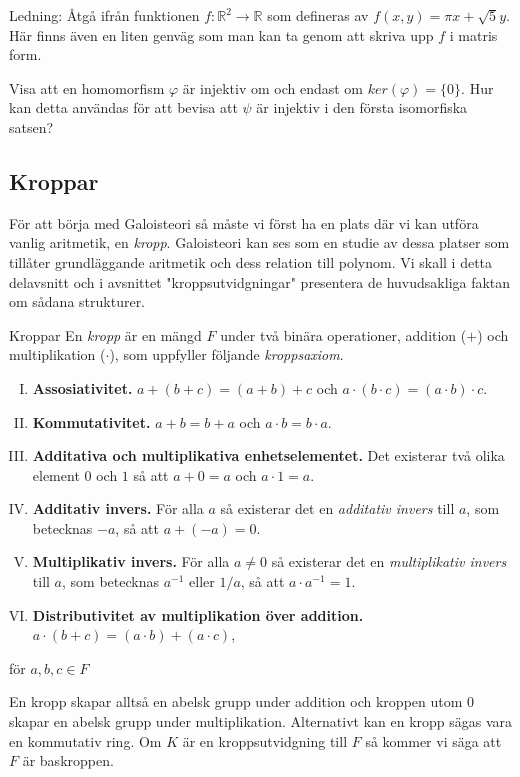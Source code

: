 \documentclass{article}
\theoremstyle{definition}
\begin{document}
Ledning: Åtgå ifrån funktionen $f: \mathbb{R}^2 \rightarrow \mathbb{R}$ som defineras av $f(x, y) = \pi x + \sqrt 5 y$. 
Här finns även en liten genväg som man kan ta genom att skriva upp $f$ i matris form. 


\begin{ovning}{2}
  Visa att en homomorfism $\varphi$ är injektiv om och endast om $ker(\varphi) = \{0\}.$ Hur kan detta användas för att bevisa att 
  $\psi$ är injektiv i den första isomorfiska satsen?
\end{ovning}

\subsection{Kroppar}
För att börja med Galoisteori så måste vi först ha en plats där vi kan utföra vanlig aritmetik, en \textit{kropp}. Galoisteori kan ses som en studie 
av dessa platser som tillåter grundläggande aritmetik och dess relation till polynom. Vi skall i detta delavsnitt och i avsnittet "kroppsutvidgningar" 
presentera de huvudsakliga faktan om 
sådana strukturer. 


\begin{mydef}{Kroppar}{}
    En \textit{kropp} är en mängd $F$ under två binära operationer, addition ($+$) och multiplikation ($\cdot$), som uppfyller följande \textit{kroppsaxiom}.
    \begin{enumerate}[I)]
        \item \textbf{Assosiativitet.} $a + (b + c) = (a + b) + c$ och $a \cdot (b \cdot c) = (a \cdot b) \cdot c$.
        \item \textbf{Kommutativitet.} $a + b = b + a$ och $a \cdot b = b \cdot a$.
        \item \textbf{Additativa och multiplikativa enhetselementet.} Det existerar två olika element $0$ och $1$ så att $a + 0 = a$ och $a \cdot 1 = a.$
        \item \textbf{Additativ invers.} För alla $a$ så existerar det en \textit{additativ invers} till $a$, som betecknas
        $-a$, så att $a + (-a) = 0$.
        \item \textbf{Multiplikativ invers.} För alla $a \neq 0$ så existerar det en \textit{multiplikativ invers} till $a$, som betecknas $a^{-1}$ eller $1/a$, så att 
        $a \cdot a^{-1} = 1.$
        \item \textbf{Distributivitet av multiplikation över addition.} $a \cdot (b + c) = (a \cdot b) + (a \cdot c)$,
    \end{enumerate}
    för $a, b, c \in F$
\end{mydef}
En kropp skapar alltså en abelsk grupp under addition och kroppen utom $0$ skapar en abelsk grupp under multiplikation. Alternativt kan en kropp sägas
vara en kommutativ ring. Om $K$ är en kroppsutvidgning till $F$ så kommer vi säga att $F$ är baskroppen. 
\end{document}
